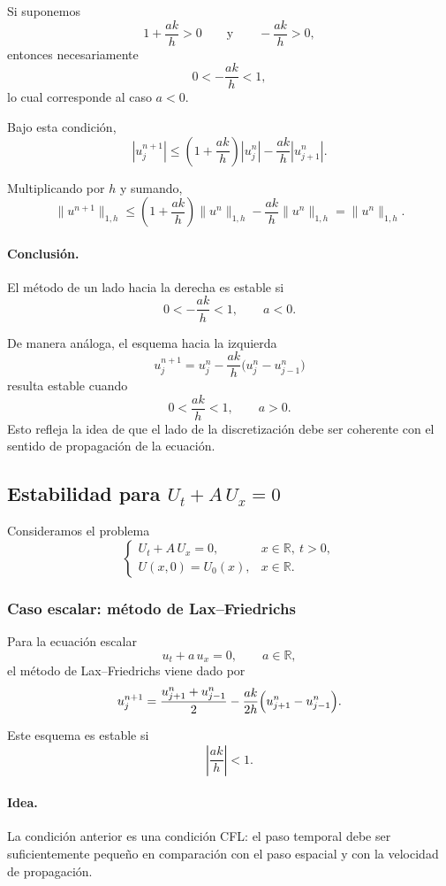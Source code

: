 Si suponemos
\[
1+\frac{ak}{h}>0
\qquad \text{y} \qquad
-\frac{ak}{h}>0,
\]
entonces necesariamente
\[
0<-\frac{ak}{h}<1,
\]
lo cual corresponde al caso \(a<0\).

Bajo esta condición,
\[
|u_j^{n+1}|
\le
\left(1+\frac{ak}{h}\right)|u_j^n|
-
\frac{ak}{h}|u_{j+1}^n|.
\]

Multiplicando por \(h\) y sumando,
\[
\|u^{n+1}\|_{1,h}
\le
\left(1+\frac{ak}{h}\right)\|u^n\|_{1,h}
-
\frac{ak}{h}\|u^n\|_{1,h}
=
\|u^n\|_{1,h}.
\]

\paragraph{Conclusión.}
El método de un lado hacia la derecha es estable si
\[
\boxed{0<-\frac{ak}{h}<1, \qquad a<0.}
\]

\begin{observacion}
De manera análoga, el esquema hacia la izquierda
\[
u_j^{n+1}
=
u_j^n-\frac{ak}{h}\bigl(u_j^n-u_{j-1}^n\bigr)
\]
resulta estable cuando
\[
0<\frac{ak}{h}<1,
\qquad a>0.
\]
Esto refleja la idea de que el lado de la discretización debe ser coherente con el sentido de propagación de la ecuación.
\end{observacion}

\subsection{Estabilidad para \(U_t+A\,U_x=0\)}

Consideramos el problema
\[
\begin{cases}
U_t+A\,U_x=0, & x\in\mathbb{R},\ t>0,\\[4pt]
U(x,0)=U_0(x), & x\in\mathbb{R}.
\end{cases}
\]

\subsubsection{Caso escalar: método de Lax--Friedrichs}

Para la ecuación escalar
\[
u_t+a\,u_x=0,
\qquad a\in\mathbb{R},
\]
el método de Lax--Friedrichs viene dado por
\[
u_j^{n+1}
=
\frac{u_{j+1}^n+u_{j-1}^n}{2}
-\frac{ak}{2h}\Bigl(u_{j+1}^n-u_{j-1}^n\Bigr).
\]

Este esquema es estable si
\[
\left|\frac{ak}{h}\right|<1.
\]

\paragraph{Idea.}
La condición anterior es una condición CFL: el paso temporal debe ser suficientemente pequeño en comparación con el paso espacial y con la velocidad de propagación.

